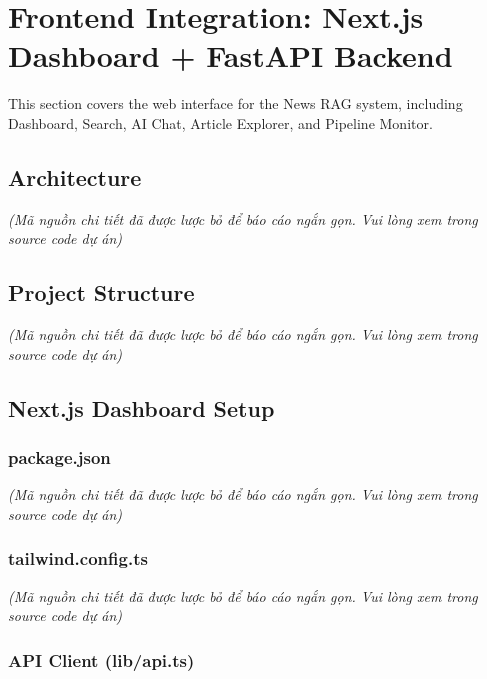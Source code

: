 \hypertarget{frontend-integration-next.js-dashboard-fastapi-backend}{%
\section{Frontend Integration: Next.js Dashboard + FastAPI
Backend}}

This section covers the web interface for the News RAG system, including
Dashboard, Search, AI Chat, Article Explorer, and Pipeline Monitor.

\hypertarget{architecture}{%
\subsection{Architecture}}

\emph{(Mã nguồn chi tiết đã được lược bỏ để báo cáo ngắn gọn. Vui lòng
xem trong source code dự án)}

\hypertarget{project-structure}{%
\subsection{Project Structure}}

\emph{(Mã nguồn chi tiết đã được lược bỏ để báo cáo ngắn gọn. Vui lòng
xem trong source code dự án)}

\hypertarget{next.js-dashboard-setup}{%
\subsection{Next.js Dashboard Setup}}

\hypertarget{package.json}{%
\subsubsection{package.json}}

\emph{(Mã nguồn chi tiết đã được lược bỏ để báo cáo ngắn gọn. Vui lòng
xem trong source code dự án)}

\hypertarget{tailwind.config.ts}{%
\subsubsection{tailwind.config.ts}}

\emph{(Mã nguồn chi tiết đã được lược bỏ để báo cáo ngắn gọn. Vui lòng
xem trong source code dự án)}

\hypertarget{api-client-libapi.ts}{%
\subsubsection{API Client (lib/api.ts)}}

